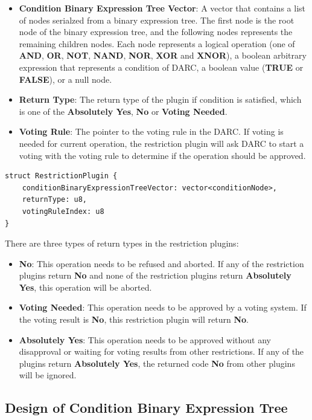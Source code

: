 \documentclass[main.tex]{subfiles}
\begin{document}
\begin{itemize}
    \item \textbf{Condition Binary Expression Tree Vector}: A vector that contains a list of nodes serialzed from a binary expression tree. The first node is the root node of the binary expression tree, and the following nodes represents the remaining children nodes. Each node represents a logical operation (one of \textbf{AND}, \textbf{OR}, \textbf{NOT}, \textbf{NAND}, \textbf{NOR}, \textbf{XOR} and \textbf{XNOR}), a boolean arbitrary expression that represents a condition of DARC, a boolean value (\textbf{TRUE} or \textbf{FALSE}), or a null node.
    \item \textbf{Return Type}: The return type of the plugin if condition is satisfied, which is one of the \textbf{Absolutely Yes}, \textbf{No} or \textbf{Voting Needed}.
    \item \textbf{Voting Rule}: The pointer to the voting rule in the DARC. If voting is needed for current operation, the restriction plugin will ask DARC to start a voting with the voting rule to determine if the operation should be approved.
\end{itemize}

\begin{lstlisting}
struct RestrictionPlugin {  
    conditionBinaryExpressionTreeVector: vector<conditionNode>,
    returnType: u8,
    votingRuleIndex: u8
}
\end{lstlisting}

There are three types of return types in the restriction plugins:
\begin{itemize}
\item \textbf{No}: This operation needs to be refused and aborted. If any of the restriction plugins return \textbf{No} and none of the restriction plugins return \textbf{Absolutely Yes}, this operation will be aborted.
\item \textbf{Voting Needed}: This operation needs to be approved by a voting system. If the voting result is \textbf{No}, this restriction plugin will return \textbf{No}.
\item \textbf{Absolutely Yes}: This operation needs to be approved without any disapproval or waiting for voting results from other restrictions. If any of the plugins return \textbf{Absolutely Yes}, the returned code \textbf{No} from other plugins will be ignored.
\end{itemize}




\subsection{Design of Condition Binary Expression Tree}
\end{document}

